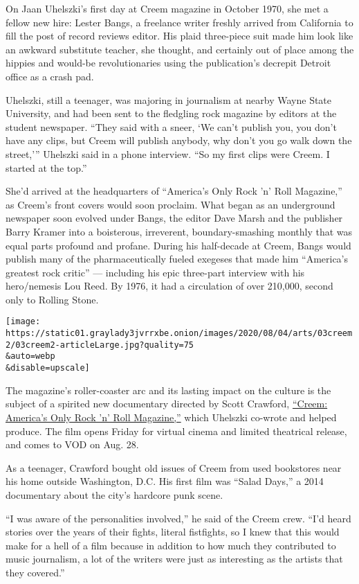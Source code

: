 On Jaan Uhelszki's first day at Creem magazine in October 1970, she met
a fellow new hire: Lester Bangs, a freelance writer freshly arrived from
California to fill the post of record reviews editor. His plaid
three-piece suit made him look like an awkward substitute teacher, she
thought, and certainly out of place among the hippies and would-be
revolutionaries using the publication's decrepit Detroit office as a
crash pad.

Uhelszki, still a teenager, was majoring in journalism at nearby Wayne
State University, and had been sent to the fledgling rock magazine by
editors at the student newspaper. ``They said with a sneer, `We can't
publish you, you don't have any clips, but Creem will publish anybody,
why don't you go walk down the street,''' Uhelszki said in a phone
interview. ``So my first clips were Creem. I started at the top.''

She'd arrived at the headquarters of ``America's Only Rock 'n' Roll
Magazine,'' as Creem's front covers would soon proclaim. What began as
an underground newspaper soon evolved under Bangs, the editor Dave Marsh
and the publisher Barry Kramer into a boisterous, irreverent,
boundary-smashing monthly that was equal parts profound and profane.
During his half-decade at Creem, Bangs would publish many of the
pharmaceutically fueled exegeses that made him ``America's greatest rock
critic'' --- including his epic three-part interview with his
hero/nemesis Lou Reed. By 1976, it had a circulation of over 210,000,
second only to Rolling Stone.

\texttt{[image: https://static01.graylady3jvrrxbe.onion/images/2020/08/04/arts/03creem2/03creem2-articleLarge.jpg?quality=75\\\&auto=webp\\\&disable=upscale]}

The magazine's roller-coaster arc and its lasting impact on the culture
is the subject of a spirited new documentary directed by Scott Crawford,
\href{https://www.creemmag.com/pages/documentary}{``Creem: America's
Only Rock 'n' Roll Magazine,''} which Uhelszki co-wrote and helped
produce. The film opens Friday for virtual cinema and limited theatrical
release, and comes to VOD on Aug. 28.

As a teenager, Crawford bought old issues of Creem from used bookstores
near his home outside Washington, D.C. His first film was ``Salad
Days,'' a 2014 documentary about the city's hardcore punk scene.

``I was aware of the personalities involved,'' he said of the Creem
crew. ``I'd heard stories over the years of their fights, literal
fistfights, so I knew that this would make for a hell of a film because
in addition to how much they contributed to music journalism, a lot of
the writers were just as interesting as the artists that they covered.''

